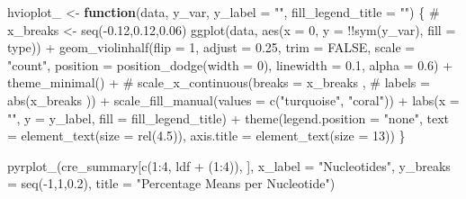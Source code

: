 \documentclass[
  letterpaper,
]{article}
\newenvironment{Shaded}{\begin{snugshade}}{\end{snugshade}}
\newcommand{\AttributeTok}[1]{\textcolor[rgb]{0.40,0.45,0.13}{#1}}
\newcommand{\CommentTok}[1]{\textcolor[rgb]{0.37,0.37,0.37}{#1}}
\newcommand{\ConstantTok}[1]{\textcolor[rgb]{0.56,0.35,0.01}{#1}}
\newcommand{\ControlFlowTok}[1]{\textcolor[rgb]{0.00,0.23,0.31}{\textbf{#1}}}
\newcommand{\DecValTok}[1]{\textcolor[rgb]{0.68,0.00,0.00}{#1}}
\newcommand{\FloatTok}[1]{\textcolor[rgb]{0.68,0.00,0.00}{#1}}
\newcommand{\FunctionTok}[1]{\textcolor[rgb]{0.28,0.35,0.67}{#1}}
\newcommand{\NormalTok}[1]{\textcolor[rgb]{0.00,0.23,0.31}{#1}}
\newcommand{\OtherTok}[1]{\textcolor[rgb]{0.00,0.23,0.31}{#1}}
\newcommand{\SpecialCharTok}[1]{\textcolor[rgb]{0.37,0.37,0.37}{#1}}
\newcommand{\StringTok}[1]{\textcolor[rgb]{0.13,0.47,0.30}{#1}}
\begin{document}
\begin{Shaded}
\begin{Highlighting}[]
\NormalTok{hvioplot\_ }\OtherTok{\textless{}{-}} \ControlFlowTok{function}\NormalTok{(data, y\_var, }\AttributeTok{y\_label =} \StringTok{""}\NormalTok{,}
                     \AttributeTok{fill\_legend\_title =} \StringTok{""}\NormalTok{) \{}
  \CommentTok{\# x\_breaks \textless{}{-} seq({-}0.12,0.12,0.06)}
  \FunctionTok{ggplot}\NormalTok{(data, }\FunctionTok{aes}\NormalTok{(}\AttributeTok{x =} \DecValTok{0}\NormalTok{, }\AttributeTok{y =} \SpecialCharTok{!!}\FunctionTok{sym}\NormalTok{(y\_var), }\AttributeTok{fill =}\NormalTok{ type)) }\SpecialCharTok{+}
    \FunctionTok{geom\_violinhalf}\NormalTok{(}\AttributeTok{flip =} \DecValTok{1}\NormalTok{, }\AttributeTok{adjust =} \FloatTok{0.25}\NormalTok{,}
                    \AttributeTok{trim =} \ConstantTok{FALSE}\NormalTok{, }\AttributeTok{scale =} \StringTok{"count"}\NormalTok{,}
                    \AttributeTok{position =} \FunctionTok{position\_dodge}\NormalTok{(}\AttributeTok{width =} \DecValTok{0}\NormalTok{),}
                    \AttributeTok{linewidth =} \FloatTok{0.1}\NormalTok{, }\AttributeTok{alpha =} \FloatTok{0.6}\NormalTok{) }\SpecialCharTok{+}
    \FunctionTok{theme\_minimal}\NormalTok{() }\SpecialCharTok{+}
    \CommentTok{\# scale\_x\_continuous(breaks = x\_breaks ,}
    \CommentTok{\#                    labels = abs(x\_breaks )) +}
    \FunctionTok{scale\_fill\_manual}\NormalTok{(}\AttributeTok{values =} \FunctionTok{c}\NormalTok{(}\StringTok{"turquoise"}\NormalTok{, }\StringTok{"coral"}\NormalTok{)) }\SpecialCharTok{+}
    \FunctionTok{labs}\NormalTok{(}\AttributeTok{x =} \StringTok{""}\NormalTok{, }\AttributeTok{y =}\NormalTok{ y\_label, }\AttributeTok{fill =}\NormalTok{ fill\_legend\_title) }\SpecialCharTok{+}
    \FunctionTok{theme}\NormalTok{(}\AttributeTok{legend.position =} \StringTok{"none"}\NormalTok{,}
          \AttributeTok{text =} \FunctionTok{element\_text}\NormalTok{(}\AttributeTok{size =} \FunctionTok{rel}\NormalTok{(}\FloatTok{4.5}\NormalTok{)),}
          \AttributeTok{axis.title =} \FunctionTok{element\_text}\NormalTok{(}\AttributeTok{size =} \DecValTok{13}\NormalTok{))}
\NormalTok{\}}
\end{Highlighting}
\end{Shaded}

\begin{Shaded}
\begin{Highlighting}[]
\FunctionTok{pyrplot\_}\NormalTok{(cre\_summary[}\FunctionTok{c}\NormalTok{(}\DecValTok{1}\SpecialCharTok{:}\DecValTok{4}\NormalTok{, ldf }\SpecialCharTok{+}\NormalTok{ (}\DecValTok{1}\SpecialCharTok{:}\DecValTok{4}\NormalTok{)), ], }
      \AttributeTok{x\_label =} \StringTok{"Nucleotides"}\NormalTok{, }\AttributeTok{y\_breaks =} \FunctionTok{seq}\NormalTok{(}\SpecialCharTok{{-}}\DecValTok{1}\NormalTok{,}\DecValTok{1}\NormalTok{,}\FloatTok{0.2}\NormalTok{), }
      \AttributeTok{title =} \StringTok{"Percentage Means per Nucleotide"}\NormalTok{)}
\end{Highlighting}
\end{Shaded}
\end{document}
